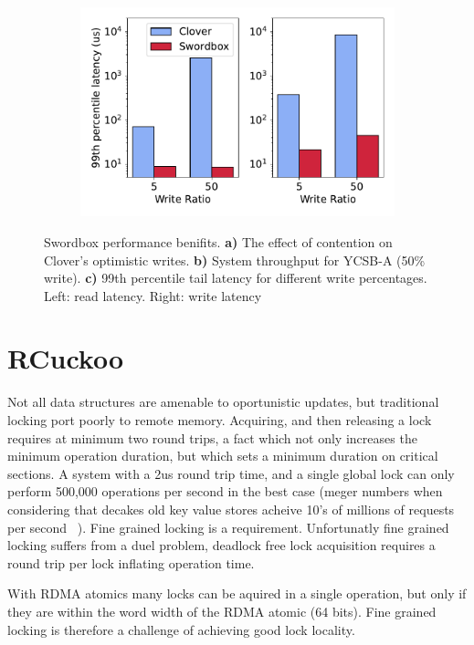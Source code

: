 \begin{figure}[t!]
\begin{subfigure}{.33\textwidth}
      \centering
      \includegraphics[width=.9\linewidth]{fig/99th_latency.pdf}
    \end{subfigure}

    \caption{Swordbox performance benifits. \textbf{a)} The effect of contention on
    Clover's optimistic writes. \textbf{b)} System throughput
    for YCSB-A (50\% write). \textbf{c)} 99th percentile tail
    latency for different write percentages. Left: read
    latency. Right: write latency}
        
    \label{fig:swordbox}
\end{figure}

\section{RCuckoo}

Not all data structures are amenable to oportunistic
updates, but traditional locking port poorly to remote
memory. Acquiring, and then releasing a lock requires at
minimum two round trips, a fact which not only increases the
minimum operation duration, but which sets a minimum
duration on critical sections. A system with a 2us round
trip time, and a single global lock can only perform 500,000
operations per second in the best case (meger numbers when
considering that decakes old key value stores acheive 10's
of millions of requests per second ~\cite{herd}). Fine
grained locking is a requirement. Unfortunatly fine grained
locking suffers from a duel problem, deadlock free lock
acquisition requires a round trip per lock inflating
operation time. 

With RDMA atomics many locks can be aquired in a single
operation, but only if they are within the word width of the
RDMA atomic (64 bits). Fine grained locking is therefore a
challenge of achieving good lock locality.

